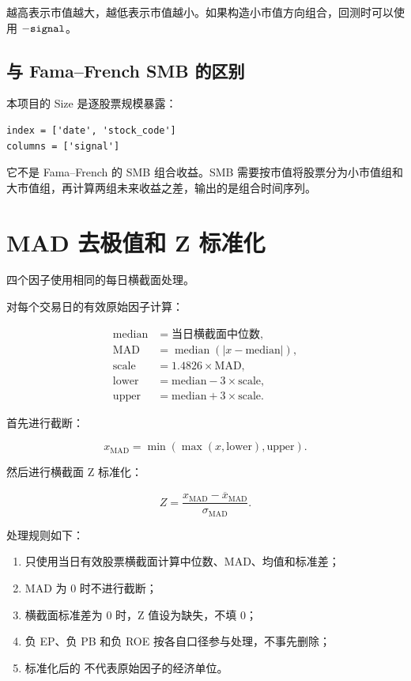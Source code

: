 \documentclass[UTF8,a4paper,12pt]{ctexart}
\newcommand{\code}[1]{\texttt{\detokenize{#1}}}
\begin{document}
\code{signal} 越高表示市值越大，越低表示市值越小。如果构造小市值方向组合，回测时可以使用 \(-\code{signal}\)。

\subsection{与 Fama--French SMB 的区别}

本项目的 Size 是逐股票规模暴露：

\begin{verbatim}
index = ['date', 'stock_code']
columns = ['signal']
\end{verbatim}

它不是 Fama--French 的 SMB 组合收益。SMB 需要按市值将股票分为小市值组和大市值组，再计算两组未来收益之差，输出的是组合时间序列。

\section{MAD 去极值和 Z 标准化}

四个因子使用相同的每日横截面处理。

对每个交易日的有效原始因子计算：

\begin{align}
\mathrm{median} &= \text{当日横截面中位数},\\
\mathrm{MAD} &= \operatorname{median}(|x-\mathrm{median}|),\\
\mathrm{scale} &= 1.4826\times\mathrm{MAD},\\
\mathrm{lower} &= \mathrm{median}-3\times\mathrm{scale},\\
\mathrm{upper} &= \mathrm{median}+3\times\mathrm{scale}.
\end{align}

首先进行截断：

\begin{equation}
x_{\mathrm{MAD}}
=
\min\left(\max(x,\mathrm{lower}),\mathrm{upper}\right).
\end{equation}

然后进行横截面 Z 标准化：

\begin{equation}
Z
=
\frac{x_{\mathrm{MAD}}-\overline{x}_{\mathrm{MAD}}}
{\sigma_{\mathrm{MAD}}}.
\end{equation}

处理规则如下：

\begin{enumerate}
  \item 只使用当日有效股票横截面计算中位数、MAD、均值和标准差；
  \item MAD 为 0 时不进行截断；
  \item 横截面标准差为 0 时，Z 值设为缺失，不填 0；
  \item 负 EP、负 PB 和负 ROE 按各自口径参与处理，不事先删除；
  \item 标准化后的 \code{signal} 不代表原始因子的经济单位。
\end{enumerate}
\end{document}
